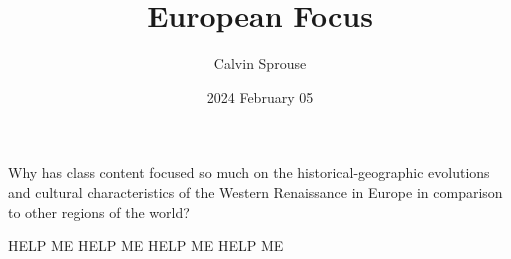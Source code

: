 \documentclass[a4paper, 12pt]{article}
\title{European Focus}
\author{Calvin Sprouse}
\affil{Geography 101 World Regional Geography}
\date{2024 February 05}
\begin{document}
\maketitle


\doublespacing\noindent
Why has class content focused so much on the historical-geographic evolutions and cultural characteristics of the Western Renaissance in Europe in comparison to other regions of the world?
\vspace*{1\baselineskip}

HELP ME HELP ME HELP ME HELP ME
\end{document}
